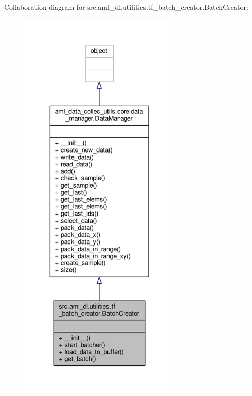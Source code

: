 Collaboration diagram for src.\-aml\-\_\-dl.\-utilities.\-tf\-\_\-batch\-\_\-creator.\-Batch\-Creator\-:\nopagebreak
\begin{figure}[H]
\begin{center}
\leavevmode
\includegraphics[height=550pt]{classsrc_1_1aml__dl_1_1utilities_1_1tf__batch__creator_1_1_batch_creator__coll__graph}
\end{center}
\end{figure}
